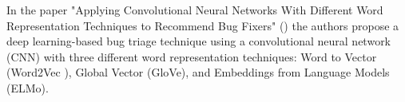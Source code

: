 	
	In the paper "Applying Convolutional Neural Networks With Different Word Representation Techniques to Recommend Bug Fixers" () the authors propose a deep learning-based bug triage technique using a convolutional neural network (CNN) with three different word representation techniques: Word to Vector (Word2Vec ), Global Vector (GloVe), and Embeddings from Language Models (ELMo). 
	
	 



